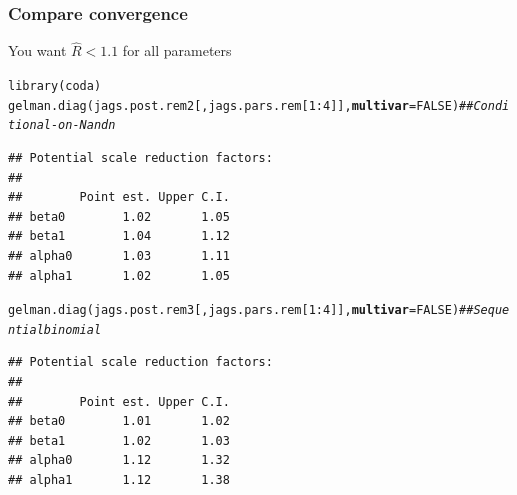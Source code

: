 \documentclass[color=usenames,dvipsnames]{beamer}\usepackage[]{graphicx}\usepackage[]{color}
\makeatletter
\newcommand{\hlnum}[1]{\textcolor[rgb]{0.69,0.494,0}{#1}}%
\newcommand{\hlcom}[1]{\textcolor[rgb]{0.514,0.506,0.514}{\textit{#1}}}%
\newcommand{\hlopt}[1]{\textcolor[rgb]{0,0,0}{#1}}%
\newcommand{\hlstd}[1]{\textcolor[rgb]{0,0,0}{#1}}%
\newcommand{\hlkwc}[1]{\textcolor[rgb]{0,0,0}{\textbf{#1}}}%
\newcommand{\hlkwd}[1]{\textcolor[rgb]{0.004,0.004,0.506}{#1}}%
\newenvironment{kframe}{%
 \def\at@end@of@kframe{}%
 \ifinner\ifhmode%
  \def\at@end@of@kframe{\end{minipage}}%
  \begin{minipage}{\columnwidth}%
 \fi\fi%
 \def\FrameCommand##1{\hskip\@totalleftmargin \hskip-\fboxsep
 \colorbox{shadecolor}{##1}\hskip-\fboxsep
     \hskip-\linewidth \hskip-\@totalleftmargin \hskip\columnwidth}%
 \MakeFramed {\advance\hsize-\width
   \@totalleftmargin\z@ \linewidth\hsize
   \@setminipage}}%
 {\par\unskip\endMakeFramed%
 \at@end@of@kframe}
\newenvironment{knitrout}{}{} %
\makeatother
\begin{document}
\begin{frame}[fragile]
  \frametitle{Compare convergence}
  \small
\centering
You want $\hat{R}<1.1$ for all parameters \\
\begin{knitrout}\tiny
{}\color{fgcolor}\begin{kframe}
\begin{alltt}
\hlkwd{library}\hlstd{(coda)}
\hlkwd{gelman.diag}\hlstd{(jags.post.rem2[,jags.pars.rem[}\hlnum{1}\hlopt{:}\hlnum{4}\hlstd{]],} \hlkwc{multivar}\hlstd{=}\hlnum{FALSE}\hlstd{)} \hlcom{## Conditional-on-N and n}
\end{alltt}
\begin{verbatim}
## Potential scale reduction factors:
## 
##        Point est. Upper C.I.
## beta0        1.02       1.05
## beta1        1.04       1.12
## alpha0       1.03       1.11
## alpha1       1.02       1.05
\end{verbatim}
\end{kframe}
\end{knitrout}
\pause
\vspace{-8pt}
\begin{knitrout}\tiny
{}\color{fgcolor}\begin{kframe}
\begin{alltt}
\hlkwd{gelman.diag}\hlstd{(jags.post.rem3[,jags.pars.rem[}\hlnum{1}\hlopt{:}\hlnum{4}\hlstd{]],} \hlkwc{multivar}\hlstd{=}\hlnum{FALSE}\hlstd{)} \hlcom{## Sequential binomial}
\end{alltt}
\begin{verbatim}
## Potential scale reduction factors:
## 
##        Point est. Upper C.I.
## beta0        1.01       1.02
## beta1        1.02       1.03
## alpha0       1.12       1.32
## alpha1       1.12       1.38
\end{verbatim}
\end{kframe}
\end{knitrout}

\end{frame}
\end{document}
